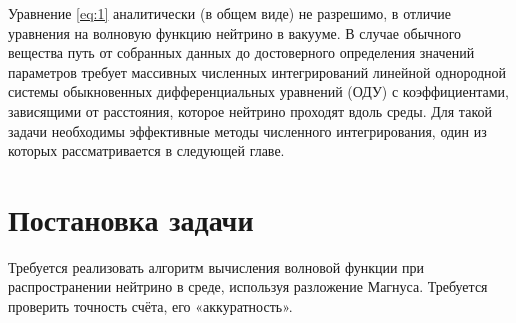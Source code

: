 \documentclass[12pt]{article}
\begin{document}
Уравнение \eqref{eq:1} аналитически (в общем виде) не разрешимо, в отличие уравнения на волновую функцию нейтрино в вакууме. В случае обычного вещества путь от собранных данных до достоверного определения значений параметров требует массивных численных интегрирований линейной однородной системы обыкновенных дифференциальных уравнений (ОДУ) с коэффициентами, зависящими от расстояния, которое нейтрино проходят вдоль среды. Для такой задачи необходимы эффективные методы численного интегрирования, один из которых рассматривается в следующей главе.


\newpage 

\section{Постановка задачи}

Требуется реализовать алгоритм вычисления волновой функции при распространении
нейтрино в среде, используя разложение Магнуса. 
Требуется проверить точность
счёта, его «аккуратность».
\end{document}
